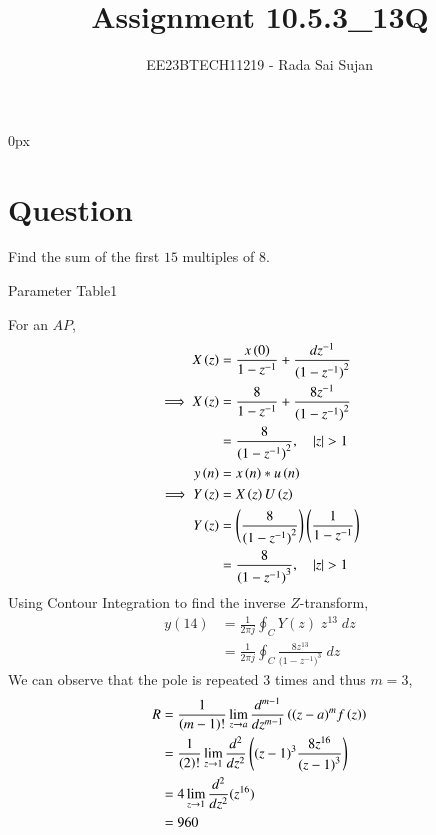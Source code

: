 \documentclass[journal,12pt,twocolumn]{IEEEtran}
\theoremstyle{remark}
\begin{document}
\parindent 0px

\title{Assignment 10.5.3\_13Q}
\author{EE23BTECH11219 - Rada Sai Sujan$^{}$%
}
\maketitle
\newpage
\bigskip
\section*{Question}
Find the sum of the first $15$ multiples of $8$. \\
\solution

\begin{table}[ht]
    \centering
    \def\arraystretch{1.5}
    
    \caption{Parameter Table1}
    \label{tab:10.5.3.1}
\end{table}
For an $AP$,
\begin{align}
    X\left(z\right) &= \frac{ x\left(0\right) }{1-z^{-1}} + \frac{dz^{-1}}{{(1-z^{-1})}^{2}}    \\
    \implies X\left(z\right) &= \frac{8}{1-z^{-1}} + \frac{8z^{-1}}{{(1-z^{-1})}^{2}} \\
    &= \frac{8}{({1-z^{-1})}^{2}} ,\quad \left\vert z\right\vert>1    \\
    y\left(n\right)&=x\left(n\right)\ast u\left(n\right)\\
    \implies Y\left(z\right)&=X\left(z\right)U\left(z\right)   \\
    Y\left(z\right)&=\left(\frac{8}{({1-z^{-1})}^{2}}\right)\left(\frac{1}{1-z^{-1}}\right)  \\
    &=\frac{8}{({1-z^{-1})}^{3}} ,\quad \left\vert z\right\vert>1 
\end{align}
 Using Contour Integration to find the inverse $Z$-transform,
\begin{align}
    y(14)&=\frac{1}{2\pi j}\oint_{C}Y(z) \;z^{13} \;dz  \\
    &=\frac{1}{2\pi j}\oint_{C}\frac{8z^{13}}{({1-z^{-1})}^{3}} \;dz 
\end{align}
We can observe that the pole is repeated $3$ times and thus $m=3$,
\begin{align}
    R&=\frac{1}{\left(m-1\right)!}\lim\limits_{z\to a}\frac{d^{m-1}}{dz^{m-1}}\left({(z-a)}^{m}f\left(z\right)\right)  \\
    &=\frac{1}{\left(2\right)!}\lim\limits_{z\to 1}\frac{d^{2}}{dz^{2}}\left({(z-1)}^{3}\frac{8z^{16}}{{(z-1)}^3}\right)   \\
    &=4\lim\limits_{z\to 1}\frac{d^2}{dz^2}(z^{16})   \\
    &=960
\end{align}
\end{document}
